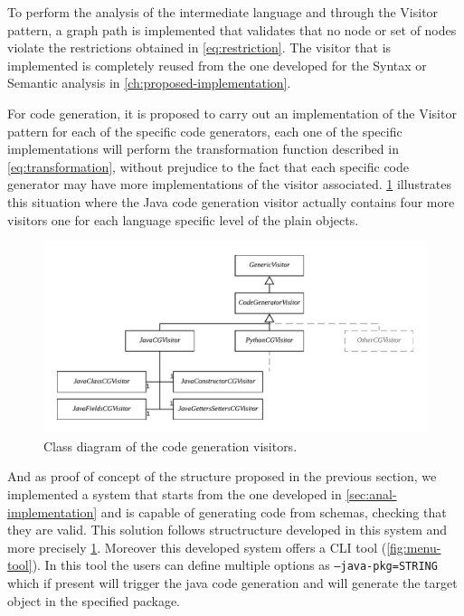 To perform the analysis of the intermediate language and through the Visitor pattern,
a graph path is implemented that validates that no node or set of nodes
violate the restrictions obtained in \cref{eq:restriction}. The visitor that is implemented is
completely reused from the one developed for the Syntax or Semantic analysis in \cref{ch:proposed-implementation}.

For code generation, it is proposed to carry out an implementation of the Visitor pattern for each of the specific code generators,
each one of the specific implementations will perform the transformation function described in \cref{eq:transformation},
without prejudice to the fact that each specific code generator may have more implementations of the visitor associated.
\cref{fig:class-diagram-cg} illustrates this situation where the Java code generation visitor actually contains four more visitors
one for each language specific level of the plain objects.

\begin{figure}
    \includegraphics[width=\textwidth]{images/class-diagra-cg.pdf}
    \centering
	\caption[Class diagram of the code generation visitors]{Class diagram of the code generation visitors.}
    \label{fig:class-diagram-cg}
\end{figure}

And as proof of concept of the structure proposed in the previous section, we implemented a system that starts from the one
developed in \cref{sec:anal-implementation} and is capable of generating code from schemas, checking that they are valid.
This solution follows structructure developed in this system and more precisely \cref{fig:class-diagram-cg}. Moreover this
developed system offers a CLI tool (\cref{fig:menu-tool}). In this tool the users can define multiple options as \texttt{--java-pkg=STRING} which if
present will trigger the java code generation and will generate the target object in the specified package.

